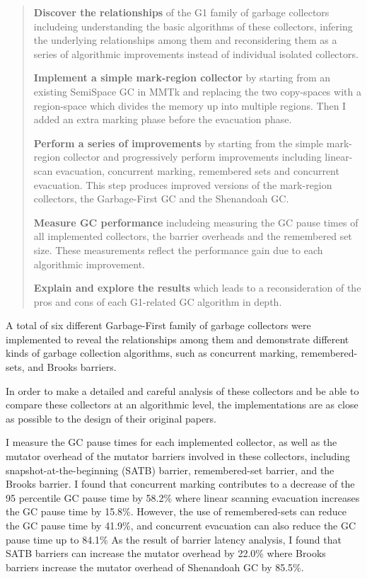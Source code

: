 \begin{quote}
  \textbf{Discover the relationships}
    of the G1 family of garbage collectors includeing understanding the basic algorithms
    of these collectors, infering the underlying relationships among them and reconsidering them as
    a series of algorithmic improvements instead of individual isolated collectors.

  \textbf{Implement a simple mark-region collector}
    by starting from an existing SemiSpace GC in MMTk and replacing the two copy-spaces
    with a region-space which divides the memory up into multiple regions.
    Then I added an extra marking phase before the evacuation phase.

  \textbf{Perform a series of improvements}
    by starting from the simple mark-region collector and progressively perform
    improvements including linear-scan evacuation, concurrent marking, remembered sets
    and concurrent evacuation. This step produces improved versions of the
    mark-region collectors, the Garbage-First GC and the Shenandoah GC.

  \textbf{Measure GC performance}
    includeing measuring the GC pause times of all implemented collectors, the 
    barrier overheads and the remembered set size. These measurements reflect the
    performance gain due to each algorithmic improvement.

  \textbf{Explain and explore the results} which leads to a reconsideration
    of the pros and cons of each G1-related GC algorithm in depth.
\end{quote}

A total of six different Garbage-First family of garbage collectors were implemented to reveal
the relationships among them and demonstrate different kinds of garbage collection
algorithms, such as concurrent marking, remembered-sets, and Brooks barriers.

In order to make a detailed and careful analysis of these collectors and
be able to compare these collectors at an algorithmic level, the implementations
are as close as possible to the design of their original papers.

I measure the GC pause times for each implemented collector, as well as the mutator
overhead of the mutator barriers involved in these collectors, including
snapshot-at-the-beginning (SATB) barrier, remembered-set barrier, and the Brooks barrier.
I found that concurrent marking contributes to a decrease of the 95 percentile GC pause time by 58.2\%
where linear scanning evacuation increases the GC pause time by 15.8\%.
However, the use of remembered-sets can reduce the GC pause time by 41.9\%,
and concurrent evacuation can also reduce the GC pause time up to 84.1\%
As the result of barrier latency analysis, I found that SATB barriers can
increase the mutator overhead by 22.0\% where Brooks barriers
increase the mutator overhead of Shenandoah GC by 85.5\%.

